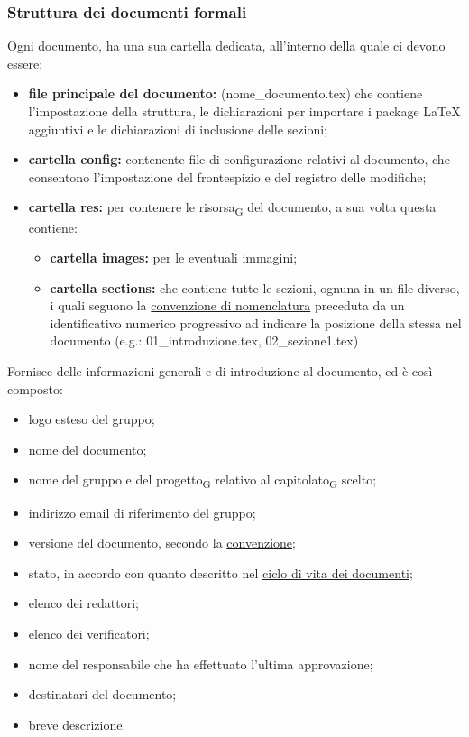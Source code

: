     \subsubsection{Struttura dei documenti formali}
    Ogni documento, ha una sua cartella dedicata, all'interno della quale ci devono essere:
    \begin{itemize}
        \item \textbf{file principale del documento: }(nome\_documento.tex) che contiene l'impostazione della struttura, le dichiarazioni per importare i package \LaTeX{} aggiuntivi e le dichiarazioni di inclusione delle sezioni;
        \item \textbf{cartella config: }contenente file di configurazione relativi al documento, che consentono l'impostazione del frontespizio e del registro delle modifiche;
        \item \textbf{cartella res: }per contenere le risorsa\textsubscript{G} del documento, a sua volta questa contiene:
        \begin{itemize}
            \item \textbf{cartella images: }per le eventuali immagini;
            \item \textbf{cartella sections: }che contiene tutte le sezioni, ognuna in un file diverso, i quali seguono la \hyperref[convezionenomifile]{convenzione di nomenclatura} preceduta da un identificativo numerico progressivo ad indicare la posizione della stessa nel documento (e.g.: 01\_introduzione.tex, 02\_sezione1.tex)
        \end{itemize}
    \end{itemize}
    Fornisce delle informazioni generali e di introduzione al documento, ed è così composto:
    \begin{itemize}
        \item logo esteso del gruppo;
        \item nome del documento;
        \item nome del gruppo e del progetto\textsubscript{G} relativo al capitolato\textsubscript{G} scelto;
        \item indirizzo email di riferimento del gruppo;
        \item versione del documento, secondo la \hyperref[versions]{convenzione};
        \item stato, in accordo con quanto descritto nel \hyperref[ciclovitadoc]{ciclo di vita dei documenti};
        \item elenco dei redattori;
        \item elenco dei verificatori;
        \item nome del responsabile che ha effettuato l'ultima approvazione;
        \item destinatari del documento;
        \item breve descrizione.
    \end{itemize}
